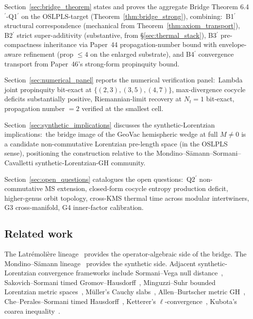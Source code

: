 \documentclass[11pt,a4paper]{article}
\theoremstyle{plain}
\theoremstyle{definition}
\newcommand{\Nt}{N_{t}}
\begin{document}
Section~\ref{sec:bridge_theorem} states and proves the aggregate
Bridge Theorem 6.4$^{\prime}$-Q1$^{\prime}$ on the OSLPLS-target
(Theorem~\ref{thm:bridge_strong}), combining:\ B1$^{\prime}$
structural correspondence (mechanical from
Theorem~\ref{thm:axiom_transport}), B2$^{\prime}$ strict
super-additivity (substantive, from \S\ref{sec:thermal_stack}),
B3$^{\prime}$ pre-compactness inheritance via Paper~44
propagation-number bound with envelope-aware refinement
(prop $\le 4$ on the enlarged substrate), and B4$^{\prime}$
convergence transport from Paper~46's strong-form propinquity
bound.

Section~\ref{sec:numerical_panel} reports the numerical verification
panel:\ Lambda joint propinquity bit-exact at
$\{(2,3),(3,5),(4,7)\}$, max-divergence cocycle deficits substantially positive,
Riemannian-limit recovery at $\Nt=1$ bit-exact, propagation number
$=2$ verified at the smallest cell.

Section~\ref{sec:synthetic_implications} discusses the
synthetic-Lorentzian implications:\ the bridge image of the GeoVac
hemispheric wedge at full $M\ne 0$ is a candidate non-commutative
Lorentzian pre-length space (in the OSLPLS sense), positioning the
construction relative to the
Mondino--S\"amann--Sormani--Cavalletti synthetic-Lorentzian-GH
community.

Section~\ref{sec:open_questions} catalogues the open questions:\
Q2$^{\prime}$ non-commutative MS extension, closed-form cocycle
entropy production deficit, higher-genus orbit topology, cross-KMS
thermal time across modular intertwiners, G3 cross-manifold, G4
inner-factor calibration.

\subsection{Related work}\label{sec:related_work_intro}

The Latr\'emoli\`ere lineage~\cite{latremoliere2018,
latremoliere_metric_st_2017, latremoliere_metric_propinquity_2015,
latremoliere2025_hypertopology, latremoliere_pp_2018af,
farsi_latremoliere2024, farsi_latremoliere2025} provides the
operator-algebraic side of the bridge. The Mondino--S\"amann
lineage~\cite{mondino_samann2025_pointed, kunzinger_samann2018,
mondino_ryborz_samann2025} provides the synthetic side. Adjacent
synthetic-Lorentzian convergence frameworks include
Sormani--Vega null distance~\cite{sormani_vega2016},
Sakovich--Sormani timed Gromov--Hausdorff~\cite{sakovich_sormani2024},
Minguzzi--Suhr bounded Lorentzian metric spaces~\cite{minguzzi_suhr2024},
M\"uller's Cauchy slabs~\cite{muller2022}, Allen--Burtscher metric
GH~\cite{allen_burtscher2022}, Che--Perales--Sormani timed
Hausdorff~\cite{che_perales_sormani2025}, Ketterer's
$\ell$-convergence~\cite{ketterer2026}, Kubota's coarea
inequality~\cite{kubota2026}.
\end{document}
